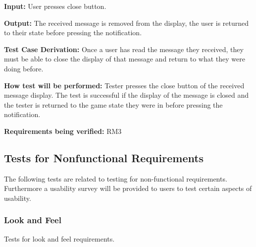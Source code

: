 \documentclass[12pt, titlepage]{article}
\begin{document}
\begin{enumerate}
\textbf{Input:} User presses close button.

\textbf{Output:} The received message is removed from the display, the user is returned to their state before pressing the notification.

\textbf{Test Case Derivation:}
Once a user has read the message they received, they must be able to close the display of that message and return to what they were doing before.

\textbf{How test will be performed:}
Tester presses the close button of the received message display. The test is successful if the display of the message is closed and the tester is returned to the game state they were in before pressing the notification. 

\textbf{Requirements being verified: } RM3

\end{enumerate}

\subsection{Tests for Nonfunctional Requirements}



The following tests are related to testing for non-functional requirements. Furthermore a usability survey will be provided to users to test certain aspects of usability.

\subsubsection{Look and Feel}
Tests for look and feel requirements.
\end{document}
